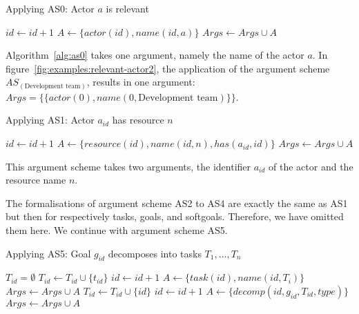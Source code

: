 \begin{algorithm}[h]
  \caption{Applying AS0: Actor $a$ is relevant}\label{alg:as0}
  \begin{algorithmic}[1]
    \State $id\gets id+1$
    \State $A \gets \{actor(id), name(id,a)\}$
    \State $Args \gets Args \cup A$
    \EndProcedure
  \end{algorithmic}
\end{algorithm}

\rationale{} Algorithm~\ref{alg:as0} takes one argument, namely the name of the actor $a$. In figure~\ref{fig:examples:relevant-actor2}, the application of the argument scheme $AS_(\text{Development team})$, results in one argument: $Args = \{\{actor(0), name(0, \text{Development team})\}\}$.

\begin{algorithm}[h]
  \caption{Applying AS1: Actor $a_{id}$ has resource $n$}\label{alg:as1}
  \begin{algorithmic}[1]
    \State $id\gets id+1$
    \State $A\gets \{resource(id), name(id,n), has(a_{id},id)\}$
    \State $Args \gets Args\cup A$
    \EndProcedure
  \end{algorithmic}
\end{algorithm}

\rationale{}  This argument scheme takes two arguments, the identifier $a_{id}$ of the actor and the resource name $n$. 

The formalisations of argument scheme AS2 to AS4 are exactly the same as AS1 but then for respectively tasks, goals, and softgoals. Therefore, we have omitted them here. We continue with argument scheme AS5.

\begin{algorithm}[h]
  \caption{Applying AS5: Goal $g_{id}$ decomposes into tasks $T_1,\ldots,T_n$}\label{alg:as5}
  \begin{algorithmic}[1]
    \State $T_{id} = \emptyset$
        \State $T_{id} \gets T_{id} \cup \{t_{id}\}$
      \Else
        \State $id\gets id+1$
        \State $A \gets \{task(id),name(id,T_i)\}$
        \State $Args \gets Args\cup A$
        \State $T_{id} \gets T_{id} \cup \{id\}$
      \EndIf
    \EndFor
    \State $id\gets id+1$
    \State $A\gets \{decomp(id, g_{id}, T_{id}, type)\}$
    \State $Args \gets Args\cup A$
    \EndProcedure
  \end{algorithmic}
\end{algorithm}

